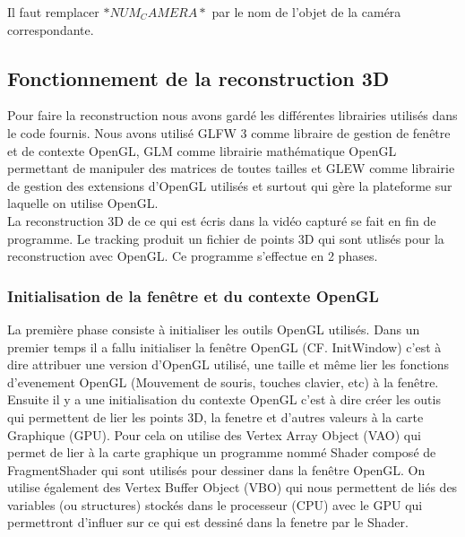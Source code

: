 Il faut remplacer $*NUM_CAMERA*$ par le nom de l'objet de la caméra correspondante.

\subsection{Fonctionnement de la reconstruction 3D}

Pour faire la reconstruction nous avons gardé les différentes librairies utilisés dans le code fournis. Nous avons utilisé GLFW 3 comme libraire de gestion de fenêtre et de contexte OpenGL, GLM comme librairie mathématique OpenGL permettant de manipuler des matrices de toutes tailles et GLEW comme librairie de gestion des extensions d'OpenGL utilisés et surtout qui gère la plateforme sur laquelle on utilise OpenGL. \\
 
La reconstruction 3D de ce qui est écris dans la vidéo capturé se fait en fin de programme. Le tracking produit un fichier de points 3D qui sont utlisés pour la reconstruction avec OpenGL. Ce programme s'effectue en 2 phases. \\

\subsubsection{Initialisation de la fenêtre et du contexte OpenGL}
La première phase consiste à initialiser les outils OpenGL utilisés. Dans un premier temps il a fallu initialiser la fenêtre OpenGL (CF. InitWindow) c'est à dire attribuer une version d'OpenGL utilisé, une taille  et même lier les fonctions d'evenement OpenGL (Mouvement de souris, touches clavier, etc) à la fenêtre. Ensuite il y a une initialisation du contexte OpenGL c'est à dire créer les outis qui permettent de lier les points 3D, la fenetre et d'autres valeurs à la carte Graphique (GPU). Pour cela on utilise des Vertex Array Object (VAO) qui permet de lier à la carte graphique un programme nommé Shader composé de FragmentShader qui sont utilisés pour dessiner dans la fenêtre OpenGL. On utilise également des Vertex Buffer Object (VBO) qui nous permettent de liés des variables (ou structures) stockés dans le processeur (CPU) avec le GPU qui permettront d'influer sur ce qui est dessiné dans la fenetre par le Shader. \\

